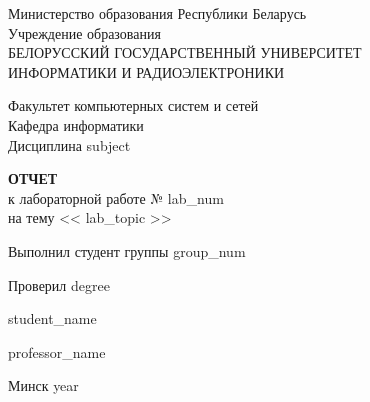 \documentclass[a4paper, hidelinks, 14pt]{extarticle}
\begin{document}

\begin{titlepage}
    \thispagestyle{empty}
    \setlength{\parindent}{0ex} %
    
    \begin{center}
        Министерство образования Республики Беларусь \\
        \vspace{1ex}
        Учреждение образования\\
        БЕЛОРУССКИЙ ГОСУДАРСТВЕННЫЙ УНИВЕРСИТЕТ\\
        ИНФОРМАТИКИ И РАДИОЭЛЕКТРОНИКИ
        \begin{flushleft}
       \vspace{1ex}
        Факультет компьютерных систем и
	сетей \\
        Кафедра информатики\\
        Дисциплина {{ subject }}
        \end{flushleft}
    \end{center}
    
    \vspace{50mm}
    
    \begin{center}
        \textbf{ ОТЧЕТ } \\
        к лабораторной работе №{{ lab_num }} \\
        на тему <<{{ lab_topic }}>>
    \end{center}
    
    \vspace{50mm}
    
    \begin{minipage}{.55\linewidth}
        Выполнил студент группы {{ group_num }}
        
        \smallskip
        
        Проверил {{ degree }}
    \end{minipage}
    \hfill
    \begin{minipage}{.4\linewidth}
        \begin{flushright}
            {{ student_name }}
            
            \smallskip
            
            {{ professor_name }}
        \end{flushright}
    \end{minipage}
    
    \vfill
    \begin{center}
        Минск {{ year }}
    \end{center}
    
    \setlength{\parindent}{1.25cm} %
\end{titlepage}
\end{document}
